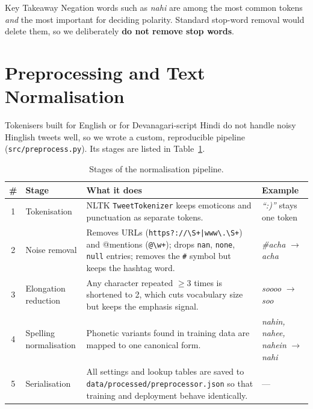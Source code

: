 \documentclass[11pt,a4paper]{article}
\begin{document}
\begin{keybox}{Key Takeaway}
Negation words such as \textit{nahi} are among the most common tokens \emph{and} the most important for deciding polarity. Standard stop-word removal would delete them, so we deliberately \textbf{do not remove stop words}.
\end{keybox}

\section{Preprocessing and Text Normalisation}

Tokenisers built for English or for Devanagari-script Hindi do not handle noisy Hinglish tweets well, so we wrote a custom, reproducible pipeline (\texttt{src/preprocess.py}). Its stages are listed in Table~\ref{tab:preprocess}.

\begin{table}[htbp]
\centering
\small
\begin{tabularx}{\textwidth}{@{}clXX@{}}
\toprule
\textbf{\#} & \textbf{Stage} & \textbf{What it does} & \textbf{Example} \\
\midrule
1 & Tokenisation & NLTK \texttt{TweetTokenizer} keeps emoticons and punctuation as separate tokens. & \textit{``:)''} stays one token \\
2 & Noise removal & Removes URLs (\texttt{https?://\textbackslash S+|www\textbackslash .\textbackslash S+}) and @mentions (\texttt{@\textbackslash w+}); drops \texttt{nan}, \texttt{none}, \texttt{null} entries; removes the \texttt{\#} symbol but keeps the hashtag word. & \textit{\#acha} $\rightarrow$ \textit{acha} \\
3 & Elongation reduction & Any character repeated $\ge 3$ times is shortened to 2, which cuts vocabulary size but keeps the emphasis signal. & \textit{soooo} $\rightarrow$ \textit{soo} \\
4 & Spelling normalisation & Phonetic variants found in training data are mapped to one canonical form. & \textit{nahin, nahee, nahein} $\rightarrow$ \textit{nahi} \\
5 & Serialisation & All settings and lookup tables are saved to \texttt{data/processed/\allowbreak preprocessor.json} so that training and deployment behave identically. & --- \\
\bottomrule
\end{tabularx}
\caption{Stages of the normalisation pipeline.}
\label{tab:preprocess}
\end{table}
\end{document}
